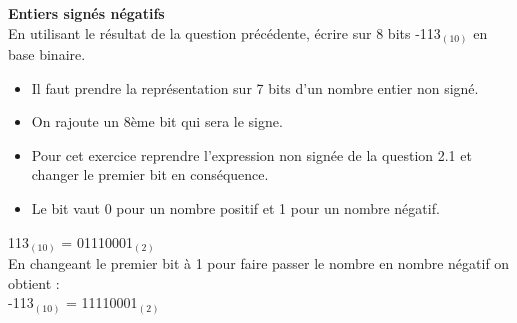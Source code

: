 \begin{Exercice}[2 minutes] \textbf{Entiers signés négatifs}\\
    En utilisant le résultat de la question précédente, écrire sur 8 bits -113$_{(10)}$ en base binaire. \\

    \begin{conseil}
        \begin{itemize}
        	\item Il faut prendre la représentation sur 7 bits d'un nombre entier non signé.
        	\item On rajoute un 8ème bit qui sera le signe.
        	\item Pour cet exercice reprendre l'expression non signée de la question 2.1 et changer le premier bit en conséquence.
        	\item Le bit vaut 0 pour un nombre positif et 1 pour un nombre négatif.
        \end{itemize} 
    \end{conseil}
    
    \begin{solution}
         113$_{(10)}$ = 01110001$_{(2)}$ \\
         
         En changeant le premier bit à 1 pour faire passer le nombre en nombre négatif on obtient : \\
         
         -113$_{(10)}$ = 11110001$_{(2)}$ \\
    \end{solution}
\end{Exercice}

